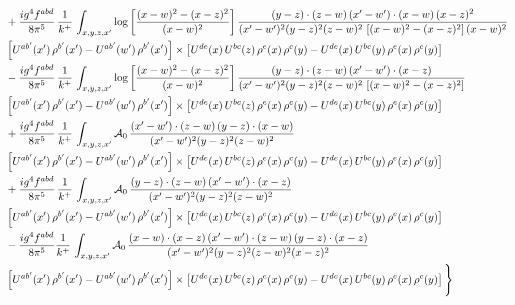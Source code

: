 \documentclass[9pt]{article}
\numberwithin{equation}{section}
\begin{document}
\begin{align}
& +\frac{ig^{4}f^{abd}}{8\pi^{5}}\,\frac{1}{k^{+}}\,\int_{x,y,z,x'}\log{\left[\frac{(x-w)^{2}-(x-z)^{2}}{(x-w)^{2}}\right]}\,
\frac{(y-z)\cdot(z-w)\,(x'-w')\cdot(x-w)\,(x-z)^{2}}{(x'-w')^{2}(y-z)^{2}(z-w)^{2}\,\left[(x-w)^{2}-(x-z)^{2}\right](x-w)^{2}}\notag \\ 
& \left[U^{ab'}(x')\,\rho^{b'}(x')-U^{ab'}(w')\, \rho^{b'}(x')\right]\times \left[U^{de}(x)\,U^{bc}(z)\, \rho^{e}(x)\,\rho^{c}(y)-U^{de}(x)\,U^{bc}(y)\,\rho^{e}(x)\,\rho^{c}(y)\right] \notag \\
& -\frac{ig^{4}f^{abd}}{8\pi^{5}}\,\frac{1}{k^{+}}\,\int_{x,y,z,x'}\log{\left[\frac{(x-w)^{2}-(x-z)^{2}}{(x-w)^{2}}\right]}\,
\frac{(y-z)\cdot(z-w)\,(x'-w')\cdot(x-z)}{(x'-w')^{2}(y-z)^{2}(z-w)^{2}\,\left[(x-w)^{2}-(x-z)^{2}\right]}\notag \\ & \left[U^{ab'}(x')\,\rho^{b'}(x')-U^{ab'}(w')\, \rho^{b'}(x')\right]\times \left[U^{de}(x)\,U^{bc}(z)\, \rho^{e}(x)\,\rho^{c}(y)-U^{de}(x)\,U^{bc}(y)\,\rho^{e}(x)\,\rho^{c}(y)\right] \notag \\
& +\frac{ig^{4}f^{abd}}{8\pi^{5}}\,\frac{1}{k^{+}}\,\int_{x,y,z,x'}\mathcal{A}_{0}\,
\frac{(x'-w')\cdot(z-w)\,(y-z)\cdot(x-w)}{(x'-w')^{2}(y-z)^{2}(z-w)^{2}}\notag \\
& \left[U^{ab'}(x')\,\rho^{b'}(x')-U^{ab'}(w')\, \rho^{b'}(x')\right]\times \left[U^{de}(x)\,U^{bc}(z)\, \rho^{e}(x)\,\rho^{c}(y)-U^{de}(x)\,U^{bc}(y)\,\rho^{e}(x)\,\rho^{c}(y)\right] \notag \\
& +\frac{ig^{4}f^{abd}}{8\pi^{5}}\,\frac{1}{k^{+}}\,\int_{x,y,z,x'}\mathcal{A}_{0}\,
\frac{(y-z)\cdot(z-w)\,(x'-w')\cdot(x-z)}{(x'-w')^{2}(y-z)^{2}(z-w)^{2}}\notag \\ & \left[U^{ab'}(x')\,\rho^{b'}(x')-U^{ab'}(w')\, \rho^{b'}(x')\right]\times \left[U^{de}(x)\,U^{bc}(z)\, \rho^{e}(x)\,\rho^{c}(y)-U^{de}(x)\,U^{bc}(y)\,\rho^{e}(x)\,\rho^{c}(y)\right] \notag \\
& -\frac{ig^{4}f^{abd}}{8\pi^{5}}\frac{1}{k^{+}}\,\int_{x,y,z,x'}\mathcal{A}_{0}\,
\frac{(x-w)\cdot(x-z)\,(x'-w')\cdot(z-w)\,(y-z)\cdot(x-z)}{(x'-w')^{2}(y-z)^{2}(z-w)^{2}(x-z)^{2}}\notag \\ & \left[U^{ab'}(x')\,\rho^{b'}(x')-U^{ab'}(w')\, \rho^{b'}(x')\right]\times \left[U^{de}(x)\,U^{bc}(z)\, \rho^{e}(x)\,\rho^{c}(y)-U^{de}(x)\,U^{bc}(y)\,\rho^{e}(x)\,\rho^{c}(y)\right]\Bigg\}
\end{align}
\end{document}
